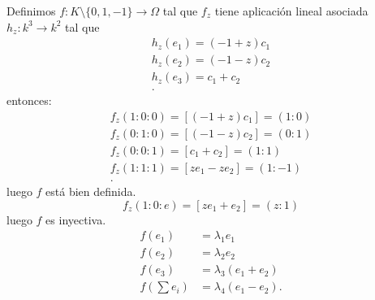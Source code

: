 \documentclass[10pt,a4paper,openright]{book}
\theoremstyle{break}
\begin{document}
\begin{itemize}
Definimos $f: K\setminus \{0, 1, -1\} \rightarrow \Omega$ tal que $f_z$ tiene aplicación lineal asociada $h_z: k^3 \rightarrow k^2$ tal que
\begin{align*}
    h_z\left( e_1 \right) = \left( -1 + z \right) c_1\\
    h_z\left( e_2 \right) = \left( -1 - z \right) c_2\\
    h_z\left( e_3 \right) = c_1 + c_2\\
.\end{align*}
entonces: 
\begin{align*}
    f_z\left( 1 : 0 : 0 \right) = \left[ \left( -1 + z \right) c_1 \right] = \left( 1 : 0 \right)\\
    f_z\left( 0 : 1 : 0 \right) = \left[ \left( -1 - z \right) c_2 \right] = \left( 0 : 1 \right)\\
    f_z\left( 0 : 0 : 1 \right) = \left[ c_1 + c_2\right] = \left( 1 : 1 \right)\\
    f_z\left( 1 : 1 : 1 \right) = \left[ ze_1 - ze_2 \right] = \left( 1 : -1 \right)\\
.\end{align*}
luego $f$ está bien definida.
\[
f_z\left( 1 : 0 : e \right) = \left[ ze_1 + e_2 \right] = \left( z : 1 \right) 
\]
luego $f$ es inyectiva.
\begin{align*}
    f\left( e_1 \right) &= \lambda_1 e_1\\
    f\left( e_2 \right) &= \lambda_2 e_2\\
    f\left( e_3 \right) &= \lambda_3 \left( e_1 + e_2 \right) \\
    f\left( \sum e_i  \right) &= \lambda_4 \left( e_1 - e_2 \right)
.\end{align*}
\end{itemize}
\end{document}
